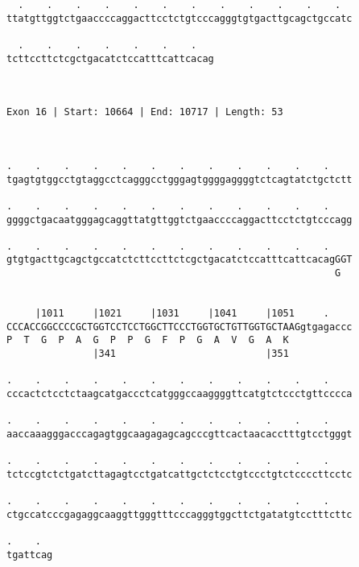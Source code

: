 \documentclass{article}
\begin{document}
\begin{Verbatim}
  .    .    .    .    .    .    .    .    .    .    .    .  
ttatgttggtctgaaccccaggacttcctctgtcccagggtgtgacttgcagctgccatc
                                                            
  .    .    .    .    .    .    .   
tcttccttctcgctgacatctccatttcattcacag
                                    
                                    
 
Exon 16 | Start: 10664 | End: 10717 | Length: 53



.    .    .    .    .    .    .    .    .    .    .    .    
tgagtgtggcctgtaggcctcagggcctgggagtggggaggggtctcagtatctgctctt
                                                            
.    .    .    .    .    .    .    .    .    .    .    .    
ggggctgacaatgggagcaggttatgttggtctgaaccccaggacttcctctgtcccagg
                                                            
.    .    .    .    .    .    .    .    .    .    .    .    
gtgtgacttgcagctgccatctcttccttctcgctgacatctccatttcattcacagGGT
                                                         G  
                                                            
  
     |1011     |1021     |1031     |1041     |1051     .    
CCCACCGGCCCCGCTGGTCCTCCTGGCTTCCCTGGTGCTGTTGGTGCTAAGgtgagaccc
P  T  G  P  A  G  P  P  G  F  P  G  A  V  G  A  K           
               |341                          |351           
  
.    .    .    .    .    .    .    .    .    .    .    .    
cccactctcctctaagcatgaccctcatgggccaaggggttcatgtctccctgttcccca
                                                            
.    .    .    .    .    .    .    .    .    .    .    .    
aaccaaagggacccagagtggcaagagagcagcccgttcactaacacctttgtcctgggt
                                                            
.    .    .    .    .    .    .    .    .    .    .    .    
tctccgtctctgatcttagagtcctgatcattgctctcctgtccctgtctccccttcctc
                                                            
.    .    .    .    .    .    .    .    .    .    .    .    
ctgccatcccgagaggcaaggttgggtttcccagggtggcttctgatatgtcctttcttc
                                                            
.    .  
tgattcag
        
        
 

\end{Verbatim}
\end{document}

